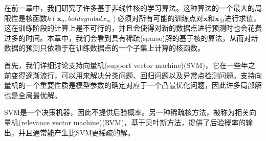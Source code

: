 在前一章中，我们研究了许多基于非线性核的学习算法。这种算法的一个最大的局限性是核函数$k(\boldsymbol{x}_n,boldsymbol{x}_m)$必须对所有可能的训练点对$\boldsymbol{x}$和$\boldsymbol{x}_M$进行求值，这在训练阶段的计算上是不可行的，并且会使得对新的数据点进行预测时也会花费过多的时间。本章中，我们会看到具有稀疏(sparse)解的基于核的算法，从而对新数据的预测只依赖于在训练数据点的一个子集上计算的核函数。

首先，我们详细讨论支持向量机(support vector machine)(SVM)，它在一些年之前变得逐渐流行，可以用来解决分类问题、回归问题以及异常点检测问题。支持向量机的一个重要性质是模型参数的确定对应于一个凸最优化问题，因此许多局部解也是全局最优解。

SVM是一个决策机器，因此不提供后验概率。另一种稀疏核方法，被称为相关向量机(relevance vector machine)(RVM)，基于贝叶斯方法，提供了后验概率的输出，并且通常能产生比SVM更稀疏的解。